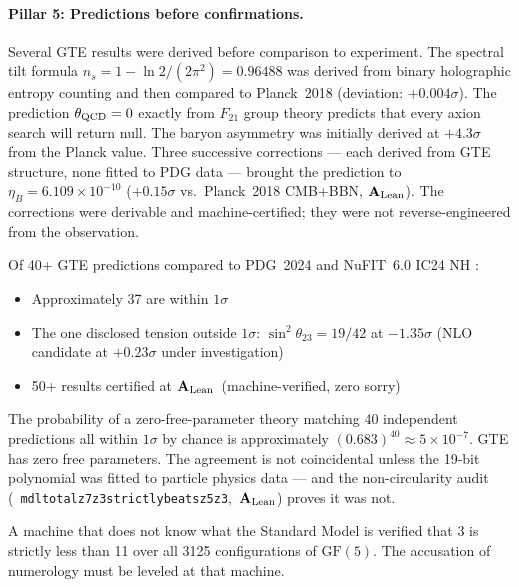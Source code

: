 \documentclass[11pt,openany]{book}
\theoremstyle{remark}
\newcommand{\lean}[1]{%
  \penalty-100
  \begingroup\def\_{\textunderscore\allowbreak}\texttt{#1}\endgroup}
\newcommand{\CatA}{\textbf{A}}
\newcommand{\CatAL}{\ensuremath{\textbf{A}_{\rm Lean}}}
\begin{document}
\paragraph{Pillar 5: Predictions before confirmations.}
Several GTE results were derived before comparison to experiment.
The spectral tilt formula $n_s = 1 - \ln 2/(2\pi^2) = 0.96488$ was derived from
binary holographic entropy counting and then compared to Planck~2018 (deviation:
$+0.004\sigma$).
The prediction $\theta_{\rm QCD} = 0$ exactly from $F_{21}$ group theory predicts
that every axion search will return null.
The baryon asymmetry was initially derived at $+4.3\sigma$ from the Planck value.
Three successive corrections --- each derived from GTE structure, none fitted to PDG
data --- brought the prediction to $\eta_B = 6.109\times10^{-10}$ ($+0.15\sigma$
vs.\ Planck~2018 CMB+BBN, \CatAL).
The corrections were derivable and machine-certified; they were not reverse-engineered
from the observation.

\medskip

\begin{tcolorbox}[colback=orange!5,colframe=orange!60,title={Quantitative Goodness of Fit (\CatA--\CatAL)},breakable]
Of 40+ GTE predictions compared to PDG~2024 and NuFIT~6.0 IC24 NH \cite{ParticleDataGroup2024,NuFIT60}:
\begin{itemize}[noitemsep]
\item Approximately 37 are within $1\sigma$
\item The one disclosed tension outside $1\sigma$: $\sin^2\theta_{23} = 19/42$ at
  $-1.35\sigma$ (NLO candidate at $+0.23\sigma$ under investigation)
\item 50+ results certified at \CatAL\ (machine-verified, zero sorry)
\end{itemize}
The probability of a zero-free-parameter theory matching 40 independent predictions all
within $1\sigma$ by chance is approximately $(0.683)^{40} \approx 5\times10^{-7}$.
GTE has zero free parameters.
The agreement is not coincidental unless the 19-bit polynomial was fitted to particle
physics data --- and the non-circularity audit \mbox{(\lean{mdl\_total\_z7z3\_strictly\_beats\_z5z3}, \CatAL)} proves it was not.
\end{tcolorbox}

A machine that does not know what the Standard Model is verified that 3 is strictly less
than 11 over all 3125 configurations of $\mathrm{GF}(5)$.
The accusation of numerology must be leveled at that machine.

\end{document}
